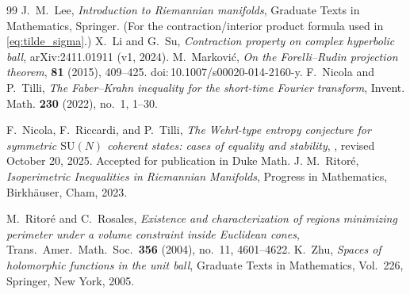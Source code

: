 \documentclass[11pt]{amsart}
\theoremstyle{plain}
\theoremstyle{definition}
\theoremstyle{remark}
\begin{document}
\begin{thebibliography}{99}
J.~M.~Lee,
\newblock \emph{Introduction to {R}iemannian manifolds},
\newblock Graduate Texts in Mathematics, Springer. (For the contraction/interior product formula used in \eqref{eq:tilde_sigma}.)
X.~Li and G.~Su,
\newblock \emph{Contraction property on complex hyperbolic ball},
\newblock arXiv:2411.01911 (v1, 2024).
M.~Markovi\'c,
\newblock \emph{On the Forelli--Rudin projection theorem},
 \textbf{81} (2015), 409--425.
\newblock doi:\,10.1007/s00020-014-2160-y.
F.~Nicola and P.~Tilli,
\newblock \emph{The {F}aber--{K}rahn inequality for the short-time {F}ourier transform},
\newblock Invent. Math. \textbf{230} (2022), no.~1, 1--30.

F.~Nicola, F.~Riccardi, and P.~Tilli,
\newblock \emph{The Wehrl-type entropy conjecture for symmetric $\mathrm{SU}(N)$ coherent states: cases of equality and stability},
, revised October 20, 2025.
\newblock Accepted for publication in {Duke Math. J.}
M.~Ritor\'e,
\emph{Isoperimetric Inequalities in Riemannian Manifolds},
Progress in Mathematics, Birkh\"auser, Cham, 2023.

M.~Ritor\'e and C.~Rosales,
\emph{Existence and characterization of regions minimizing perimeter under a volume constraint
inside Euclidean cones},
Trans.\ Amer.\ Math.\ Soc.\ \textbf{356} (2004), no.~11, 4601--4622.
K.~Zhu,
\newblock \emph{Spaces of holomorphic functions in the unit ball},
\newblock Graduate Texts in Mathematics, Vol.~226, Springer, New York, 2005.

\end{thebibliography}
\end{document}
